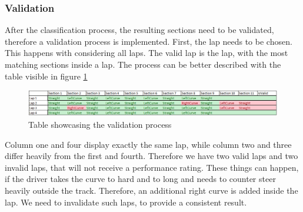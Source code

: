 \subsubsection{Validation}
After the classification process, the resulting sections need to be validated, therefore a validation process is implemented. First, the lap needs to be chosen. This happens with considering all laps. The valid lap is the lap, with the most matching sections inside a lap. The process can be better described with the table visible in figure \ref{validation}
\begin{figure}[H]
	\centering
	\includegraphics[scale= 0.5]{Pictures/validation.png}
	\caption{Table showcasing the validation process}
	\label{validation}
\end{figure}
Column one and four display exactly the same lap, while column two and three differ heavily from the first and fourth. Therefore we have two valid laps and two invalid laps, that will not receive a performance rating. These things can happen, if the driver takes the curve to hard and to long and needs to counter steer heavily outside the track. Therefore, an additional right curve is added inside the lap. We need to invalidate such laps, to provide a consistent result.
\newpage
